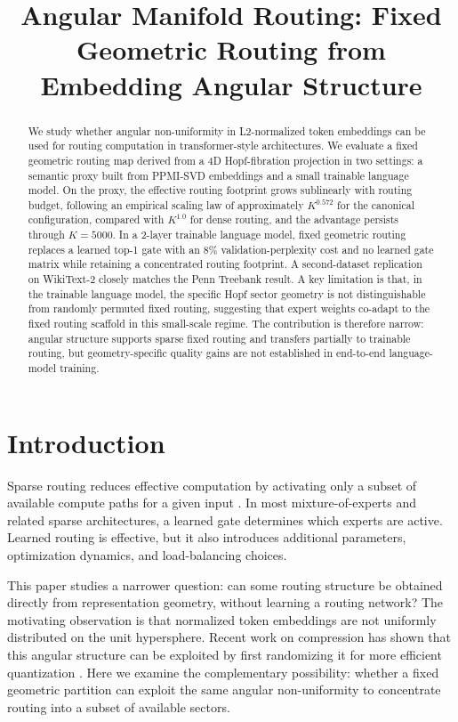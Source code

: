 \documentclass[10pt,conference]{IEEEtran}
\title{Angular Manifold Routing: Fixed Geometric Routing from Embedding Angular Structure}
\author{\IEEEauthorblockN{Casey Allard}
\IEEEauthorblockA{Independent Researcher}}
\begin{document}
\maketitle

\begin{abstract}
We study whether angular non-uniformity in L2-normalized token embeddings can be used for routing computation in transformer-style architectures. We evaluate a fixed geometric routing map derived from a 4D Hopf-fibration projection in two settings: a semantic proxy built from PPMI-SVD embeddings and a small trainable language model. On the proxy, the effective routing footprint grows sublinearly with routing budget, following an empirical scaling law of approximately $K^{0.572}$ for the canonical configuration, compared with $K^{1.0}$ for dense routing, and the advantage persists through $K=5000$. In a 2-layer trainable language model, fixed geometric routing replaces a learned top-1 gate with an 8\% validation-perplexity cost and no learned gate matrix while retaining a concentrated routing footprint. A second-dataset replication on WikiText-2 closely matches the Penn Treebank result. A key limitation is that, in the trainable language model, the specific Hopf sector geometry is not distinguishable from randomly permuted fixed routing, suggesting that expert weights co-adapt to the fixed routing scaffold in this small-scale regime. The contribution is therefore narrow: angular structure supports sparse fixed routing and transfers partially to trainable routing, but geometry-specific quality gains are not established in end-to-end language-model training.
\end{abstract}

\section{Introduction}
Sparse routing reduces effective computation by activating only a subset of available compute paths for a given input \citep{shazeer2017outrageously,fedus2022switch}. In most mixture-of-experts and related sparse architectures, a learned gate determines which experts are active. Learned routing is effective, but it also introduces additional parameters, optimization dynamics, and load-balancing choices.

This paper studies a narrower question: can some routing structure be obtained directly from representation geometry, without learning a routing network? The motivating observation is that normalized token embeddings are not uniformly distributed on the unit hypersphere. Recent work on compression has shown that this angular structure can be exploited by first randomizing it for more efficient quantization \citep{turboquant2026}. Here we examine the complementary possibility: whether a fixed geometric partition can exploit the same angular non-uniformity to concentrate routing into a subset of available sectors.
\end{document}
